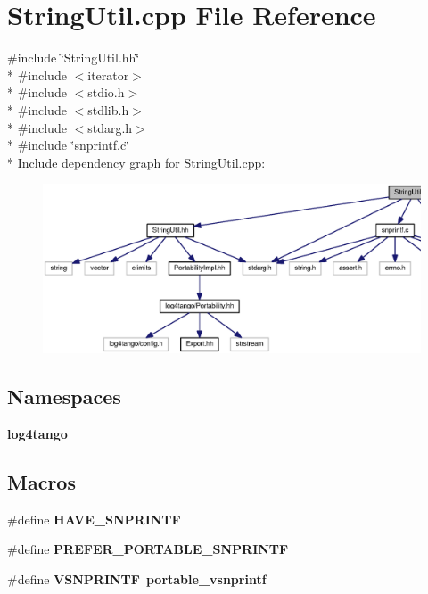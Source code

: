 \section{String\-Util.\-cpp File Reference}
\label{StringUtil_8cpp}
{\ttfamily \#include \char`\"{}String\-Util.\-hh\char`\"{}}\\*
{\ttfamily \#include $<$iterator$>$}\\*
{\ttfamily \#include $<$stdio.\-h$>$}\\*
{\ttfamily \#include $<$stdlib.\-h$>$}\\*
{\ttfamily \#include $<$stdarg.\-h$>$}\\*
{\ttfamily \#include \char`\"{}snprintf.\-c\char`\"{}}\\*
Include dependency graph for String\-Util.\-cpp\-:
\nopagebreak
\begin{figure}[H]
\begin{center}
\leavevmode
\includegraphics[width=350pt]{d8/db2/StringUtil_8cpp__incl}
\end{center}
\end{figure}
\subsection*{Namespaces}
\begin{DoxyCompactItemize}
\item 
{\bf log4tango}
\end{DoxyCompactItemize}
\subsection*{Macros}
\begin{DoxyCompactItemize}
\item 
\#define {\bf H\-A\-V\-E\-\_\-\-S\-N\-P\-R\-I\-N\-T\-F}
\item 
\#define {\bf P\-R\-E\-F\-E\-R\-\_\-\-P\-O\-R\-T\-A\-B\-L\-E\-\_\-\-S\-N\-P\-R\-I\-N\-T\-F}
\item 
\#define {\bf V\-S\-N\-P\-R\-I\-N\-T\-F}~{\bf portable\-\_\-vsnprintf}
\end{DoxyCompactItemize}


